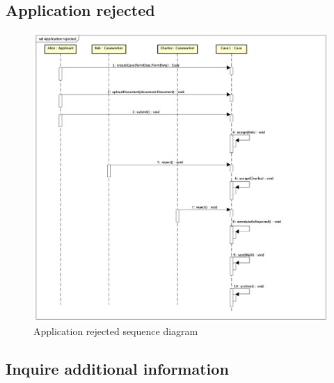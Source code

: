 \subsection{Application rejected}
\begin{figure}[htb!]
    \centering
    \includegraphics[width=\textwidth]{img/sd-application-rejected.png}
    \caption{Application rejected sequence diagram}
\end{figure}

\subsection{Inquire additional information}

